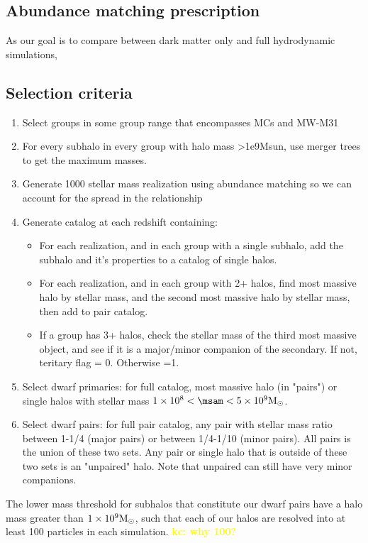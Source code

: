 \documentclass[twocolumn]{aastex631}
\newcommand{\kc}[1]{\textcolor{yellow}{\textbf{kc: #1}} }
\begin{document}
\subsection{Abundance matching prescription}\label{sec:methods-am}
As our goal is to compare between dark matter only and full hydrodynamic
simulations,

\subsection{Selection criteria}\label{sec:methods-crit}
\begin{enumerate}
  \item Select groups in some group range that encompasses MCs and MW-M31
  \item For every subhalo in every group with halo mass >1e9Msun, use merger trees to get the maximum masses.
  \item Generate 1000 stellar mass realization using abundance matching so we can account for the spread in the relationship
  \item Generate catalog at each redshift containing: 
  \begin{itemize}
    \item For each realization, and in each group with a single subhalo, add the subhalo and it's properties to a catalog of single halos.
    \item For each realization, and in each group with 2+ halos, find most massive halo by stellar mass, and the second most massive halo by stellar mass, then add to pair catalog. 
    \item If a group has 3+ halos, check the stellar mass of the third most massive object, and see if it is a major/minor companion of the secondary. If not, teritary flag = 0. Otherwise =1.
  \end{itemize}
  \item Select dwarf primaries: for full catalog, most massive halo (in "pairs") or single halos with stellar mass $1\times10^{8} < \msam < 5\times10^{9} \Msun$. 
  \item Select dwarf pairs: for full pair catalog, any pair with stellar mass ratio between 1-1/4 (major pairs) or between 1/4-1/10 (minor pairs). All pairs is the union of these two sets. Any pair or single halo that is outside of these two sets is an "unpaired" halo. Note that unpaired can still have very minor companions. 
\end{enumerate}

The lower mass threshold for subhalos that constitute our dwarf pairs have a halo mass greater than $1\times10^9\mathrm{M}_\odot$, such that each of our halos are resolved into at least 100 particles in each simulation.  
\kc{why 100?} 
\end{document}
